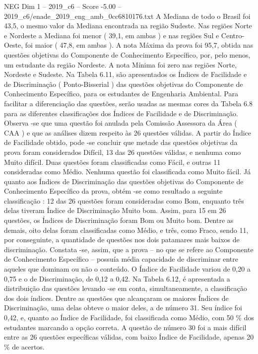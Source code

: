 \begin{textsample}{NEG Dim 1 – 2019\_c6 – Score -5.00 – 2019\_c6/enade\_2019\_eng\_amb\_0cc6810176.txt}
A Mediana de todo o Brasil foi 43,5, o mesmo valor da Mediana encontrada na região Sudeste.
Nas regiões Norte e Nordeste a Mediana foi menor ( 39,1, em ambas ) e nas regiões Sul e Centro-Oeste, foi maior ( 47,8, em ambas ).
A nota Máxima da prova foi 95,7, obtida nas questões objetivas do Componente de Conhecimento Específico, por, pelo menos, um estudante da região Nordeste.
A nota Mínima foi zero nas regiões Norte, Nordeste e Sudeste.
Na Tabela 6.11, são apresentados os Índices de Facilidade e de Discriminação ( Ponto-Bisserial ) das questões objetivas do Componente de Conhecimento Específico, para os estudantes de Engenharia Ambiental.
Para facilitar a diferenciação das questões, serão usadas as mesmas cores da Tabela 6.8 para as diferentes classificações dos Índices de Facilidade e de Discriminação.
Observa -se que uma questão foi anulada pela Comissão Assessora da Área ( CAA ) e que as análises dizem respeito às 26 questões válidas.
A partir do Índice de Facilidade obtido, pode -se concluir que metade das questões objetivas da prova foram considerados Difícil, 13 das 26 questões válidas, e nenhuma como Muito difícil.
Duas questões foram classificadas como Fácil, e outras 11 consideradas como Médio.
Nenhuma questão foi classificada como Muito fácil.
Já quanto aos Índices de Discriminação das questões objetivas do Componente de Conhecimento Específico da prova, obtém -se como resultado a seguinte classificação : 12 das 26 questões foram consideradas como Bom, enquanto três delas tiveram Índice de Discriminação Muito bom.
Assim, para 15 em 26 questões, os Índices de Discriminação foram Bom ou Muito bom.
Dentre as demais, oito delas foram classificadas como Médio, e três, como Fraco, sendo 11, por conseguinte, a quantidade de questões nos dois patamares mais baixos de discriminação.
Constata -se, assim, que a prova – no que se refere ao Componente de Conhecimento Específico – possuía média capacidade de discriminar entre aqueles que dominam ou não o conteúdo.
O Índice de Facilidade variou de 0,20 a 0,75 e o de Discriminação, de 0,12 a 0,42.
Na Tabela 6.12, é apresentada a distribuição das questões levando -se em conta, simultaneamente, a classificação dos dois índices.
Dentre as questões que alcançaram os maiores Índices de Discriminação, uma delas obteve o maior deles, a de número 31.
Seu índice foi 0,42, e, quanto ao Índice de Facilidade, foi classificada como Médio, com 50 \% dos estudantes marcando a opção correta.
A questão de número 30 foi a mais difícil entre as 26 questões específicas válidas, com baixo Índice de Facilidade, apenas 20 \% de acertos.

\end{textsample}
